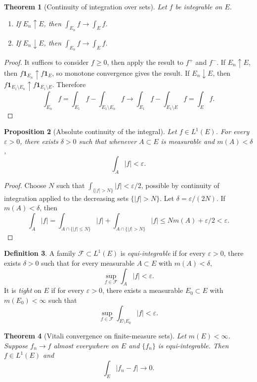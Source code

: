 \documentclass[11pt,openany]{book}
\numberwithin{equation}{chapter}
\theoremstyle{definition}
\newtheorem{definition}{Definition}[chapter]
\theoremstyle{plain}
\newtheorem{theorem}[definition]{Theorem}
\newtheorem{proposition}[definition]{Proposition}
\theoremstyle{remark}
\newcommand{\eps}{\varepsilon}
\newcommand{\1}{\mathbf{1}}
\newcommand{\abs}[1]{\left\lvert #1\right\rvert}
\begin{document}
\begin{theorem}[Continuity of integration over sets]
Let \(f\) be integrable on \(E\).
\begin{enumerate}[label=(\roman*)]
    \item If \(E_n\uparrow E\), then \(\int_{E_n}f\to\int_E f\).
    \item If \(E_n\downarrow E\), then \(\int_{E_n}f\to\int_E f\).
\end{enumerate}
\end{theorem}

\begin{proof}
It suffices to consider \(f\ge0\), then apply the result to \(f^+\) and \(f^-\).  If \(E_n\uparrow E\), then \(f\1_{E_n}\uparrow f\1_E\), so monotone convergence gives the result.  If \(E_n\downarrow E\), then \(f\1_{E_1\setminus E_n}\uparrow f\1_{E_1\setminus E}\).  Therefore
\[
    \int_{E_n}f=\int_{E_1}f-\int_{E_1\setminus E_n}f
    \to \int_{E_1}f-\int_{E_1\setminus E}f=\int_Ef.
\]
\end{proof}

\begin{proposition}[Absolute continuity of the integral]
Let \(f\in L^1(E)\).  For every \(\eps>0\), there exists \(\delta>0\) such that whenever \(A\subset E\) is measurable and \(m(A)<\delta\),
\[
    \int_A\abs f<\eps.
\]
\end{proposition}

\begin{proof}
Choose \(N\) such that \(\int_{\{\abs f>N\}}\abs f<\eps/2\), possible by continuity of integration applied to the decreasing sets \(\{\abs f>N\}\).  Let \(\delta=\eps/(2N)\).  If \(m(A)<\delta\), then
\[
    \int_A\abs f
    =\int_{A\cap\{\abs f\le N\}}\abs f+
      \int_{A\cap\{\abs f>N\}}\abs f
    \le N m(A)+\eps/2<\eps.
\]
\end{proof}

\begin{definition}
A family \(\mathcal F\subset L^1(E)\) is \emph{equi-integrable} if for every \(\eps>0\), there exists \(\delta>0\) such that for every measurable \(A\subset E\) with \(m(A)<\delta\),
\[
    \sup_{f\in\mathcal F}\int_A\abs f<\eps.
\]
It is \emph{tight} on \(E\) if for every \(\eps>0\), there exists a measurable \(E_0\subset E\) with \(m(E_0)<\infty\) such that
\[
    \sup_{f\in\mathcal F}\int_{E\setminus E_0}\abs f<\eps.
\]
\end{definition}

\begin{theorem}[Vitali convergence on finite-measure sets]
Let \(m(E)<\infty\).  Suppose \(f_n\to f\) almost everywhere on \(E\) and \(\{f_n\}\) is equi-integrable.  Then \(f\in L^1(E)\) and
\[
    \int_E\abs{f_n-f}\to0.
\]
\end{theorem}
\end{document}
